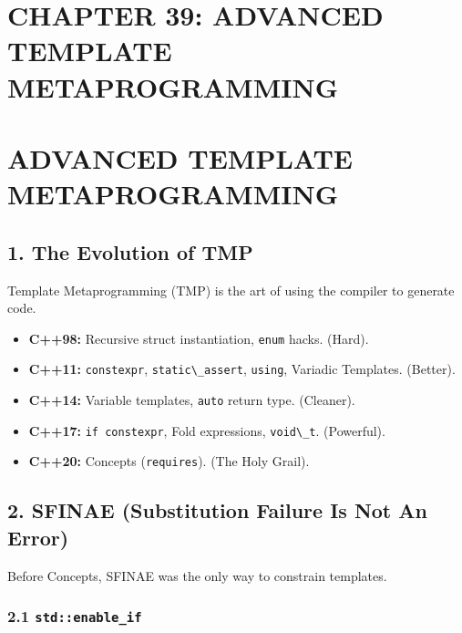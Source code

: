 \hypertarget{chapter-39-advanced-template-metaprogramming}{%
\section{CHAPTER 39: ADVANCED TEMPLATE
METAPROGRAMMING}\label{chapter-39-advanced-template-metaprogramming}}

\hypertarget{advanced-template-metaprogramming}{%
\section{ADVANCED TEMPLATE
METAPROGRAMMING}\label{advanced-template-metaprogramming}}

\hypertarget{the-evolution-of-tmp}{%
\subsection{1. The Evolution of TMP}\label{the-evolution-of-tmp}}

Template Metaprogramming (TMP) is the art of using the compiler to
generate code.

\begin{itemize}
\tightlist
\item
  \textbf{C++98:} Recursive struct instantiation,
  \passthrough{\lstinline!enum!} hacks. (Hard).
\item
  \textbf{C++11:} \passthrough{\lstinline!constexpr!},
  \passthrough{\lstinline!static\_assert!},
  \passthrough{\lstinline!using!}, Variadic Templates. (Better).
\item
  \textbf{C++14:} Variable templates, \passthrough{\lstinline!auto!}
  return type. (Cleaner).
\item
  \textbf{C++17:} \passthrough{\lstinline!if constexpr!}, Fold
  expressions, \passthrough{\lstinline!void\_t!}. (Powerful).
\item
  \textbf{C++20:} Concepts (\passthrough{\lstinline!requires!}). (The
  Holy Grail).
\end{itemize}

\hypertarget{sfinae-substitution-failure-is-not-an-error}{%
\subsection{2. SFINAE (Substitution Failure Is Not An
Error)}\label{sfinae-substitution-failure-is-not-an-error}}

Before Concepts, SFINAE was the only way to constrain templates.

\hypertarget{stdenable_if}{%
\subsubsection{\texorpdfstring{2.1
\texttt{std::enable\_if}}{2.1 std::enable\_if}}\label{stdenable_if}}

